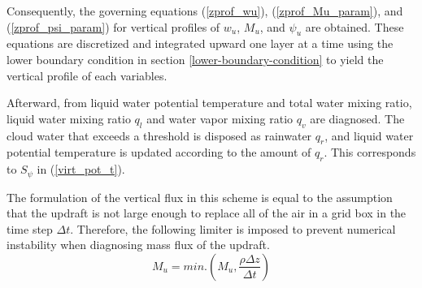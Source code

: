 Consequently, the governing equations (\ref{zprof_wu}), (\ref{zprof_Mu_param}), and (\ref{zprof_psi_param}) for vertical profiles of $w_u$, $M_u$, and $\psi_u$ are obtained.
These equations are discretized and integrated upward one layer at a time using the lower boundary condition in section \ref{lower-boundary-condition} to yield the vertical profile of each variables.

Afterward, from liquid water potential temperature and total water mixing ratio, liquid water mixing ratio $q_l$ and water vapor mixing ratio $q_v$ are diagnosed.
The cloud water that exceeds a threshold is disposed as rainwater $q_r$, and liquid water potential temperature is updated according to the amount of $q_r$. This corresponds to $S_\psi$ in (\ref{virt_pot_t}).

The formulation of the vertical flux in this scheme is equal to the assumption that the updraft is not large enough to replace all of the air in a grid box in the time step $\Delta t$.
Therefore, the following limiter is imposed to prevent numerical instability when diagnosing mass flux of the updraft.
\begin{equation}\label{Mu_limit}
    M_u = min.\left(M_u, \frac{\rho\Delta z}{\Delta t}\right)
\end{equation}

